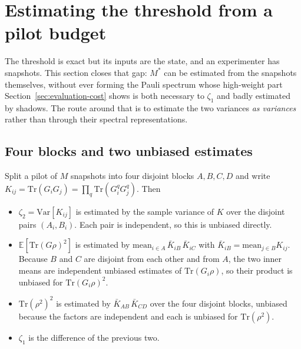 \hypertarget{estimating-the-threshold-from-a-pilot-budget}{%
\section{\texorpdfstring{Estimating the threshold from a pilot budget}{Estimating the threshold from a pilot budget}}\label{sec:pilot}}

The threshold is exact but its inputs are the state, and an experimenter has snapshots. This
section closes that gap: \(M^*\) can be estimated from the snapshots themselves, without ever
forming the Pauli spectrum whose high-weight part Section~\ref{sec:evaluation-cost} shows is both
necessary to \(\zeta_1\) and badly estimated by shadows. The route around that is to estimate the
two variances \emph{as variances} rather than through their spectral representations.

\hypertarget{four-blocks-and-two-unbiased-estimates}{%
\subsection{Four blocks and two unbiased estimates}\label{four-blocks-and-two-unbiased-estimates}}

Split a pilot of \(M\) snapshots into four disjoint blocks \(A, B, C, D\) and write
\(K_{ij} = \mathrm{Tr}(G_i G_j) = \prod_q \mathrm{Tr}(G_i^q G_j^q)\). Then

\begin{itemize}
\tightlist
\item \(\zeta_2 = \mathrm{Var}[K_{ij}]\) is estimated by the sample variance of \(K\) over the
disjoint pairs \((A_i, B_i)\). Each pair is independent, so this is unbiased directly.
\item \(\mathbb{E}[\mathrm{Tr}(G\rho)^2]\) is estimated by
\(\mathrm{mean}_{i \in A}\, \bar K_{iB}\,\bar K_{iC}\) with
\(\bar K_{iB} = \mathrm{mean}_{j\in B} K_{ij}\). Because \(B\) and \(C\) are disjoint from each
other and from \(A\), the two inner means are independent unbiased estimates of
\(\mathrm{Tr}(G_i\rho)\), so their product is unbiased for \(\mathrm{Tr}(G_i\rho)^2\).
\item \(\mathrm{Tr}(\rho^2)^2\) is estimated by \(\bar K_{AB}\,\bar K_{CD}\) over the four
disjoint blocks, unbiased because the factors are independent and each is unbiased for
\(\mathrm{Tr}(\rho^2)\).
\item \(\zeta_1\) is the difference of the previous two.
\end{itemize}

